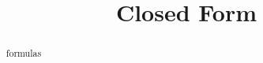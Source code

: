 \documentclass{ximera}
\title{Closed Form}
\begin{document}
\begin{abstract}
formulas
\end{abstract}
\maketitle
\end{document}
